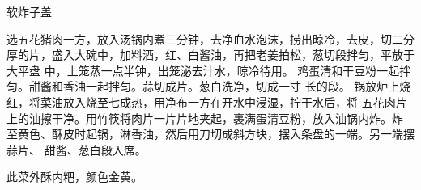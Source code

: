 \begin{recipe}{软炸子盖}

\ingredients


\cooking

\step 选五花猪肉一方，放入汤锅内煮三分钟，去净血水泡沫，捞出晾冷，去皮，切二分
厚的片，盛入大碗中，加料酒，红、白酱油，再把老姜拍松，葱切段拌匀，平放于大平盘
中，上笼蒸一点半钟，出笼泌去汁水，晾冷待用。
\step 鸡蛋清和干豆粉一起拌匀。甜酱和香油一起拌匀。蒜切成片。葱白洗净，切成一寸
长的段。
\step 锅放炉上烧红，将菜油放入烧至七成热，用净布一方在开水中浸湿，拧干水后，将
五花肉片上的油擦干净。用竹筷将肉片一片片地夹起，裹满蛋清豆粉，放入油锅内炸。炸
至黄色、酥皮时起锅，淋香油，然后用刀切成斜方块，摆入条盘的一端。另一端摆蒜片、
甜酱、葱白段入席。

\features

此菜外酥内粑，颜色金黄。

\end{recipe}

